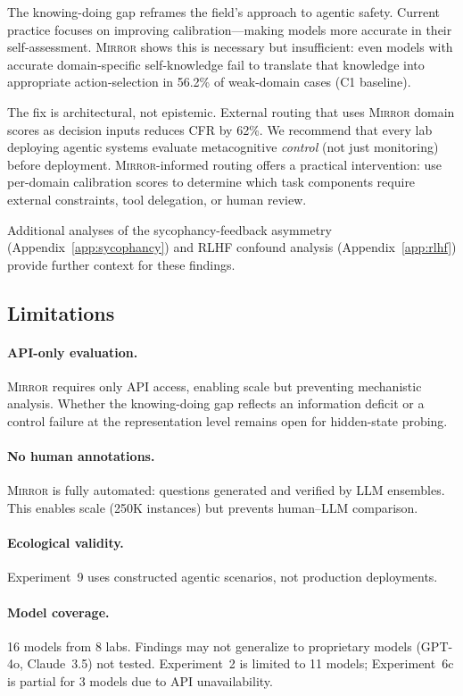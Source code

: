 \documentclass[10pt]{article}
\newcommand{\mirror}{\textsc{Mirror}}
\newcommand{\CFR}{CFR}
\begin{document}
The knowing-doing gap reframes the field's approach to agentic safety. Current
practice focuses on improving calibration---making models more accurate in their
self-assessment. \mirror{} shows this is necessary but insufficient: even models
with accurate domain-specific self-knowledge fail to translate that knowledge into
appropriate action-selection in 56.2\% of weak-domain cases (C1 baseline).

The fix is architectural, not epistemic. External routing that uses \mirror{}
domain scores as decision inputs reduces \CFR{} by 62\%. We recommend that every
lab deploying agentic systems evaluate metacognitive \textit{control} (not just
monitoring) before deployment. \mirror{}-informed routing offers a practical
intervention: use per-domain calibration scores to determine which task components
require external constraints, tool delegation, or human review.

Additional analyses of the sycophancy-feedback asymmetry (Appendix~\ref{app:sycophancy}) and RLHF confound analysis (Appendix~\ref{app:rlhf}) provide further context for these findings.

\subsection{Limitations}

\paragraph{API-only evaluation.}
\mirror{} requires only API access, enabling scale but preventing mechanistic
analysis. Whether the knowing-doing gap reflects an information deficit or a
control failure at the representation level remains open for hidden-state probing.

\paragraph{No human annotations.}
\mirror{} is fully automated: questions generated and verified by LLM ensembles.
This enables scale (250K instances) but prevents human--LLM comparison.

\paragraph{Ecological validity.}
Experiment~9 uses constructed agentic scenarios, not production deployments.

\paragraph{Model coverage.}
16 models from 8 labs. Findings may not generalize to proprietary models (GPT-4o,
Claude~3.5) not tested. Experiment~2 is limited to 11 models; Experiment~6c is
partial for 3 models due to API unavailability.
\end{document}
